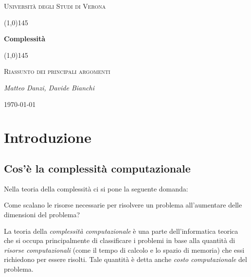 \documentclass[a4paper]{article}
\theoremstyle{definition}
\begin{document}
 \clearpage
 \begin{titlepage}
 	\centering
 	\vspace*{\fill}
 	{\scshape\LARGE Università degli Studi di Verona \par}
 	\vspace{1.5cm}
 	\line(1,0){145} \\
 	{\huge\bfseries Complessità\par}
 	\line(1,0){145} \\
 	\vspace{0.5cm}
 	{\scshape\Large Riassunto dei principali argomenti\par}
 	\vspace{2cm}
 	{\Large\itshape Matteo Danzi, Davide Bianchi\par}
 	\vspace{1cm}
 	
 	\vspace{5cm}
 	\vspace*{\fill}
 	{\large \today\par}
 \end{titlepage}
  \thispagestyle{empty}
  \newpage
	
	\tableofcontents
	
	\newpage

	\section{Introduzione}
	
	\subsection{Cos'è la complessità computazionale}
		Nella teoria della complessità ci si pone la seguente domanda:
		
		\begin{displayquote}
		Come scalano le risorse necessarie per risolvere un problema all'aumentare delle dimensioni del problema?
		\end{displayquote} 

		La teoria della \textit{complessità computazionale} è una parte dell’informatica teorica che si
		occupa principalmente di classificare i problemi in base alla quantità di \textit{risorse computazionali} (come il tempo di calcolo e lo spazio di memoria) che essi richiedono per
		essere risolti. Tale quantità è detta anche \textit{costo computazionale} del problema.
		
\end{document}
